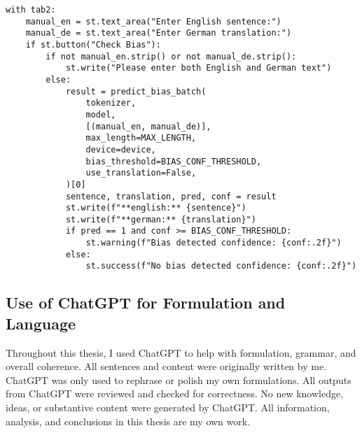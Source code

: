 \begin{appendices}
\begin{lstlisting}
with tab2:
    manual_en = st.text_area("Enter English sentence:")
    manual_de = st.text_area("Enter German translation:")
    if st.button("Check Bias"):
        if not manual_en.strip() or not manual_de.strip():
            st.write("Please enter both English and German text")
        else:
            result = predict_bias_batch(
                tokenizer,
                model,
                [(manual_en, manual_de)],
                max_length=MAX_LENGTH,
                device=device,
                bias_threshold=BIAS_CONF_THRESHOLD,
                use_translation=False,
            )[0]
            sentence, translation, pred, conf = result
            st.write(f"**english:** {sentence}")
            st.write(f"**german:** {translation}")
            if pred == 1 and conf >= BIAS_CONF_THRESHOLD:
                st.warning(f"Bias detected confidence: {conf:.2f}")
            else:
                st.success(f"No bias detected confidence: {conf:.2f}")
\end{lstlisting}

\subsection{Use of ChatGPT for Formulation and Language}

Throughout this thesis, I used ChatGPT to help with formulation, grammar, and overall coherence. All sentences and content were originally written by me. ChatGPT was only used to rephrase or polish my own formulations. All outputs from ChatGPT were reviewed and checked for correctness. No new knowledge, ideas, or substantive content were generated by ChatGPT. All information, analysis, and conclusions in this thesis are my own work.


\end{appendices}
